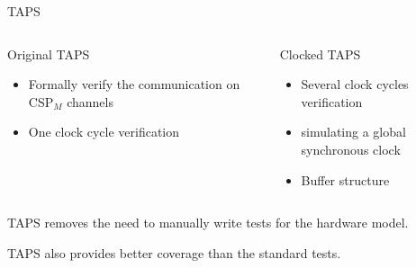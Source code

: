 \documentclass[11pt]{beamer}
\newcommand{\cspm}{CSP$_M$}
\begin{document}
\begin{frame}{TAPS}
    \begin{columns}[t, totalwidth=1.02\textwidth]

        \begin{column}{0.45\linewidth}
            \begin{block}{Original TAPS}
                \begin{itemize}

                    \item Formally verify the communication on \cspm{} channels
                    \item One clock cycle verification
                \end{itemize}
            \end{block}
        \end{column}

        \pause

        \begin{column}{0.45\linewidth}
            \begin{block}{Clocked TAPS}
                \begin{itemize}
                    \item Several clock cycles verification
                    \item simulating a global synchronous clock
                    \item Buffer structure
                \end{itemize}
            \end{block}
        \end{column}

    \end{columns}

\pause

  \begin{block}{}
     TAPS removes the need to manually write tests for the hardware model.
  \end{block}

  \pause

  \begin{block}{}
     TAPS also provides better coverage than the standard tests.
  \end{block}
\end{frame}

%
\end{document}
